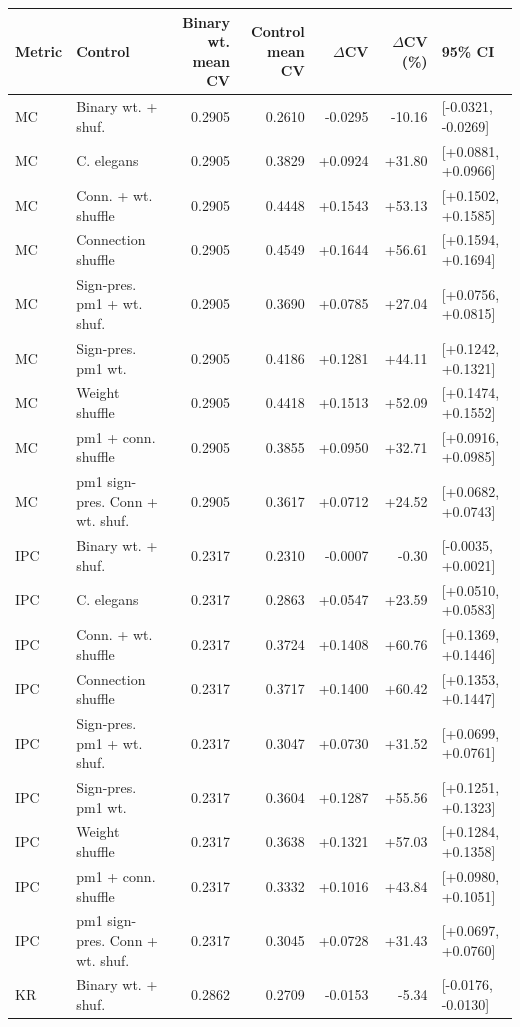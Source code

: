 \begin{tabular}{llrrrrl}
\toprule
Metric & Control & Binary wt. mean CV & Control mean CV & $\Delta$CV & $\Delta$CV (\%) & 95\% CI \\
\midrule
MC & Binary wt. + shuf. & 0.2905 & 0.2610 & -0.0295 & -10.16 & [-0.0321, -0.0269] \\
MC & C. elegans & 0.2905 & 0.3829 & +0.0924 & +31.80 & [+0.0881, +0.0966] \\
MC & Conn. + wt. shuffle & 0.2905 & 0.4448 & +0.1543 & +53.13 & [+0.1502, +0.1585] \\
MC & Connection shuffle & 0.2905 & 0.4549 & +0.1644 & +56.61 & [+0.1594, +0.1694] \\
MC & Sign-pres. pm1 + wt. shuf. & 0.2905 & 0.3690 & +0.0785 & +27.04 & [+0.0756, +0.0815] \\
MC & Sign-pres. pm1 wt. & 0.2905 & 0.4186 & +0.1281 & +44.11 & [+0.1242, +0.1321] \\
MC & Weight shuffle & 0.2905 & 0.4418 & +0.1513 & +52.09 & [+0.1474, +0.1552] \\
MC & pm1 + conn. shuffle & 0.2905 & 0.3855 & +0.0950 & +32.71 & [+0.0916, +0.0985] \\
MC & pm1 sign-pres. Conn + wt. shuf. & 0.2905 & 0.3617 & +0.0712 & +24.52 & [+0.0682, +0.0743] \\
IPC & Binary wt. + shuf. & 0.2317 & 0.2310 & -0.0007 & -0.30 & [-0.0035, +0.0021] \\
IPC & C. elegans & 0.2317 & 0.2863 & +0.0547 & +23.59 & [+0.0510, +0.0583] \\
IPC & Conn. + wt. shuffle & 0.2317 & 0.3724 & +0.1408 & +60.76 & [+0.1369, +0.1446] \\
IPC & Connection shuffle & 0.2317 & 0.3717 & +0.1400 & +60.42 & [+0.1353, +0.1447] \\
IPC & Sign-pres. pm1 + wt. shuf. & 0.2317 & 0.3047 & +0.0730 & +31.52 & [+0.0699, +0.0761] \\
IPC & Sign-pres. pm1 wt. & 0.2317 & 0.3604 & +0.1287 & +55.56 & [+0.1251, +0.1323] \\
IPC & Weight shuffle & 0.2317 & 0.3638 & +0.1321 & +57.03 & [+0.1284, +0.1358] \\
IPC & pm1 + conn. shuffle & 0.2317 & 0.3332 & +0.1016 & +43.84 & [+0.0980, +0.1051] \\
IPC & pm1 sign-pres. Conn + wt. shuf. & 0.2317 & 0.3045 & +0.0728 & +31.43 & [+0.0697, +0.0760] \\
KR & Binary wt. + shuf. & 0.2862 & 0.2709 & -0.0153 & -5.34 & [-0.0176, -0.0130] \\

\end{tabular}
